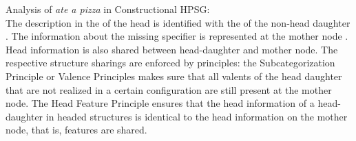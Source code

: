 \documentclass[output=paper]{langsci/langscibook}
\begin{document}
\eas
\label{ex-ate-a-pizza-sag97}
Analysis of \emph{ate a pizza} in Constructional HPSG:\\
\zs
The description in the \compsl of the head is identified with the \synsemv of the non-head daughter
. The information about the missing specifier is represented at the mother node
. Head information is also shared between head-daughter and mother node. The respective
structure sharings are enforced by principles: the Subcategorization Principle or Valence Principles
makes sure that all valents of the head daughter that are not realized in a certain configuration
are still present at the mother node. The Head Feature Principle ensures that the head information
of a head-daughter in headed structures is identical to the head information on the mother node,
that is, \head features are shared.
\end{document}
